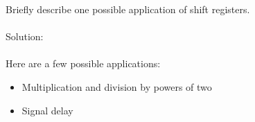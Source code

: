 Briefly describe one possible application of shift registers. \\ \\

Solution: \\ \\
Here are a few possible applications:\\
\begin{itemize}
  \item Multiplication and division by powers of two
  \item Signal delay
\end{itemize}
